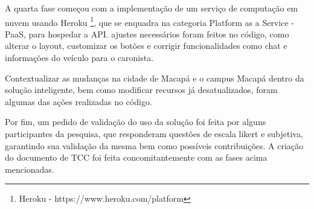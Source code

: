 A quarta fase começou com a implementação de um serviço de computação em nuvem usando Heroku \footnote{Heroku - https://www.heroku.com/platform}, que se enquadra na categoria Platform as a Service - PaaS, para hospedar a API. ajustes necessários foram feitos no código, como alterar o layout, customizar os botões e corrigir funcionalidades como chat e informações do veículo para o caronista.

Contextualizar as mudanças na cidade de Macapá e o campus Macapá dentro da solução inteligente, bem como modificar recursos já desatualizados, foram algumas das ações realizadas no código.

Por fim, um pedido de validação do uso da solução foi feita por alguns participantes da pesquisa, que responderam questões de escala likert e subjetiva, garantindo sua validação da mesma bem como possíveis contribuições. A criação do documento de TCC foi feita concomitantemente com as fases acima mencionadas.